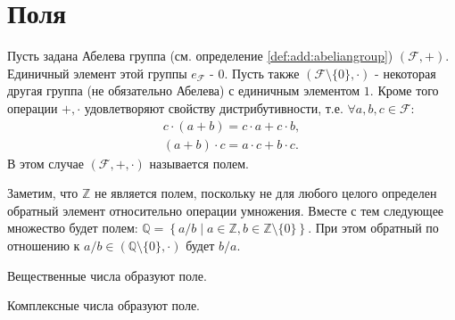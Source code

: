 \section{Поля}
\begin{definition}[Поле]
  Пусть задана Абелева группа (см. определение
  \ref{def:add:abeliangroup})  
  $(\mathcal{F}, +)$. Единичный элемент этой группы $e_\mathcal{F}$ -
  $0$. Пусть также $(\mathcal{F} \setminus \{0\}, \cdot)$ - некоторая
  другая группа (не
  обязательно Абелева) с единичным элементом $1$. Кроме того операции
  $+,\cdot$ удовлетворяют свойству дистрибутивности, т.е. $\forall
  a,b,c \in \mathcal{F}$:
  \begin{eqnarray}
  c \cdot \left(a + b\right) = c \cdot a + c \cdot b,
  \nonumber \\
  \left(a + b\right) \cdot c = a \cdot c + b \cdot c.
  \nonumber
  \end{eqnarray}
  В этом случае $(\mathcal{F}, +, \cdot)$ называется полем.
  \label{def:field}
\end{definition}

\begin{example}
  Заметим, что $\mathbb{Z}$ не является полем, поскольку не для любого
  целого определен обратный элемент относительно операции умножения. 
  Вместе с тем следующее множество будет полем: $\mathbb{Q} =
  \left\{a/b \mid a \in \mathbb{Z}, b \in 
  \mathbb{Z}\setminus\{0\}\right\}$. При этом обратный по отношению к
  $a/b \in \left(\mathbb{Q}\setminus\{0\}, \cdot\right)$ будет $b/a$.
  \label{ex:field_q}
\end{example}

\begin{example}
  Вещественные числа образуют поле.
  \label{ex:field_r}
\end{example}

\begin{example}
  Комплексные числа образуют поле.
  \label{ex:field_c}
\end{example}
